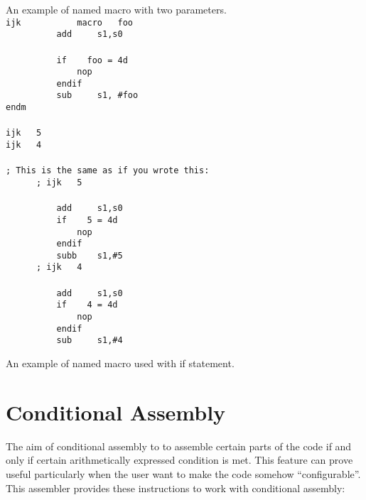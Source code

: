         An example of named macro with two parameters.\\
        {
            \usecodefont
            \verb'ijk           macro   foo'\\
            \verb'          add     s1,s0'\\
            \verb''\\
            \verb'          if    foo = 4d'\\
            \verb'              nop'\\
            \verb'          endif'\\
            \verb'          sub     s1, #foo'\\
            \verb'endm'\\\\
            \verb'ijk   5'\\
            \verb'ijk   4'\\\\
            \verb'; This is the same as if you wrote this:'\\
            \verb'      ; ijk   5'\\\\
            \verb'          add     s1,s0'\\
            \verb'          if    5 = 4d'\\
            \verb'              nop'\\
            \verb'          endif'\\
            \verb'          subb    s1,#5'\\
            \verb'      ; ijk   4'\\\\
            \verb'          add     s1,s0'\\
            \verb'          if    4 = 4d'\\
            \verb'              nop'\\
            \verb'          endif'\\
            \verb'          sub     s1,#4'\\
        }

        An example of named macro used with if statement.

\section{Conditional Assembly}
    The aim of conditional assembly to to assemble certain parts of the code if and only if certain arithmetically expressed condition is met. This feature can prove useful particularly when the user want to make the code somehow ``configurable''. This assembler provides these instructions to work with conditional assembly:

